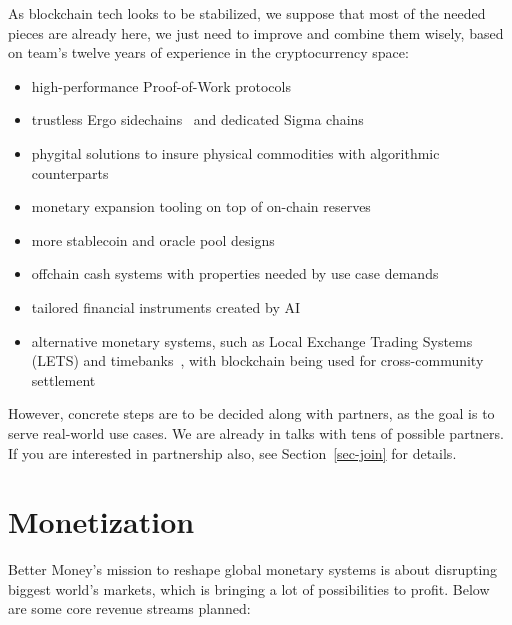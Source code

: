 \documentclass{llncs}   %
\begin{document}
As blockchain tech looks to be stabilized, we suppose that most of the needed pieces are already here, we just need to
improve and combine them wisely, based on team's twelve years of experience in the cryptocurrency space:

\begin{itemize}
  \item high-performance Proof-of-Work protocols~~\cite{prism,inputblocks}
  \item trustless Ergo sidechains~\cite{sidechains} and dedicated Sigma chains~\cite{sigmachains}
  \item phygital solutions to insure physical commodities with algorithmic counterparts~\cite{phygital}
  \item monetary expansion tooling on top of on-chain reserves~\cite{chaincash}
  \item more stablecoin and oracle pool designs
  \item offchain cash systems with properties needed by use case demands
  \item tailored financial instruments created by AI
  \item alternative monetary systems, such as Local Exchange Trading Systems (LETS) and timebanks~\cite{mcquaid2004review},
        with blockchain being used for cross-community settlement
\end{itemize}

However, concrete steps are to be decided along with partners, as the goal is to serve real-world use cases. We are already
in talks with tens of possible partners. If you are interested in partnership also, see Section~\ref{sec-join} for details.

\section{Monetization}
\label{sec-monetization}

Better Money’s mission to reshape global monetary systems is about disrupting biggest world's markets, which is bringing
a lot of possibilities to profit. Below are some core revenue streams planned:
\end{document}
